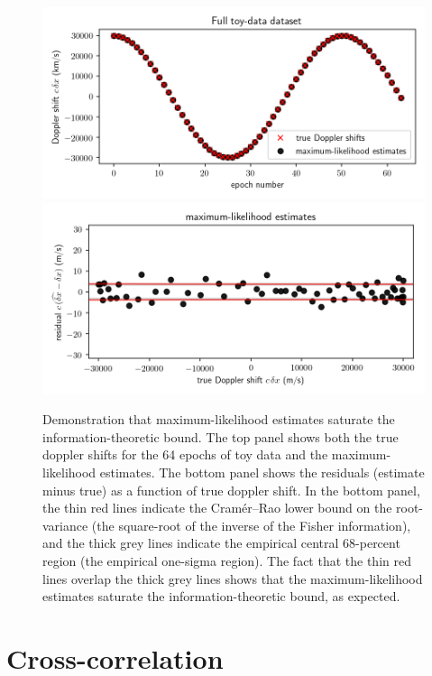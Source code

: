 \documentclass[modern]{aastex631}
\begin{document}
\begin{figure}[tp]
  \begin{mdframed}
    \begin{center}
    \includegraphics[width=\textwidth]{../notebook/full.png}
    \includegraphics[width=\textwidth]{../notebook/mlrvs.png}
    \end{center}
    \caption{Demonstration that maximum-likelihood estimates saturate the information-theoretic bound.
    The top panel shows both the true doppler shifts for the 64 epochs of toy data and the maximum-likelihood estimates.
    The bottom panel shows the residuals (estimate minus true) as a function of true doppler shift.
    In the bottom panel, the thin red lines indicate the Cram\'er--Rao lower bound on the root-variance (the square-root of the inverse of the Fisher information), and the thick grey lines indicate the empirical central 68-percent region (the empirical one-sigma region).
    The fact that the thin red lines overlap the thick grey lines shows that the maximum-likelihood estimates saturate the information-theoretic bound, as expected.\label{fig:mlrvs}}
  \end{mdframed}
\end{figure}

\section{Cross-correlation}\label{sec:ccf}
\end{document}
